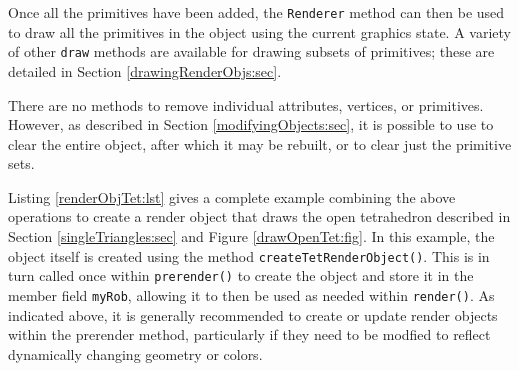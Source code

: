 Once all the primitives have been added, 
the {\tt Renderer}
method  can
then be used to draw all the primitives in the object using the
current graphics state. A variety of other {\tt draw} methods are
available for drawing subsets of primitives; these are detailed in
Section \ref{drawingRenderObjs:sec}.

There are no methods to remove individual attributes, vertices, or
primitives. However, as described in Section
\ref{modifyingObjects:sec}, it is possible to use
 to clear the
entire object, after which it may be rebuilt, or
 to clear
just the primitive sets.

Listing \ref{renderObjTet:lst} gives a complete example combining the
above operations to create a render object that draws the open
tetrahedron described in Section \ref{singleTriangles:sec} and Figure
\ref{drawOpenTet:fig}. In this example, the object itself is created
using the method {\tt createTetRenderObject()}. This is in turn called
once within {\tt prerender()} to create the object and store it in the
member field {\tt myRob}, allowing it to then be used as needed within
{\tt render()}. As indicated above, it is generally recommended to
create or update render objects within the prerender method,
particularly if they need to be modfied to reflect dynamically
changing geometry or colors.
%
